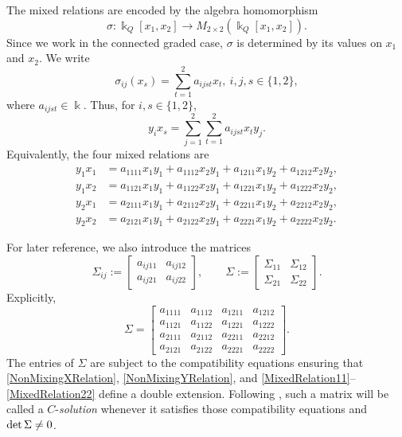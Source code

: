 \documentclass{amsart}
\theoremstyle{definition}
\theoremstyle{remark}
\numberwithin{equation}{section}
\begin{document}
The mixed relations are encoded by the algebra homomorphism
\[
\sigma:\Bbbk_Q[x_1,x_2]\to M_{2\times 2}(\Bbbk_Q[x_1,x_2]).
\]
Since we work in the connected graded case, $\sigma$ is determined by its values on $x_1$ and $x_2$. We write
\begin{equation}\label{SigmaCoordinates}
\sigma_{ij}(x_s)=\sum_{t=1}^2 a_{ijst}x_t,
\ i,j,s\in\{1,2\},
\end{equation}
where $a_{ijst}\in\Bbbk$. Thus, for $i,s\in\{1,2\}$,
\begin{equation}\label{GeneralMixedRelation}
y_ix_s
=
\sum_{j=1}^2\sum_{t=1}^2 a_{ijst}x_ty_j.
\end{equation}
Equivalently, the four mixed relations are
\begin{align}
y_1x_1
&=
a_{1111}x_1y_1+a_{1112}x_2y_1
+a_{1211}x_1y_2+a_{1212}x_2y_2, \label{MixedRelation11}\\
y_1x_2
&=
a_{1121}x_1y_1+a_{1122}x_2y_1
+a_{1221}x_1y_2+a_{1222}x_2y_2, \label{MixedRelation12}\\
y_2x_1
&=
a_{2111}x_1y_1+a_{2112}x_2y_1
+a_{2211}x_1y_2+a_{2212}x_2y_2, \label{MixedRelation21}\\
y_2x_2
&=
a_{2121}x_1y_1+a_{2122}x_2y_1
+a_{2221}x_1y_2+a_{2222}x_2y_2. \label{MixedRelation22}
\end{align}

For later reference, we also introduce the matrices
\begin{equation}\label{SigmaMatrices}
\Sigma_{ij}:=
\begin{bmatrix}
a_{ij11} & a_{ij12}\\
a_{ij21} & a_{ij22}
\end{bmatrix},
\qquad
\Sigma:=
\begin{bmatrix}
\Sigma_{11} & \Sigma_{12}\\
\Sigma_{21} & \Sigma_{22}
\end{bmatrix}.
\end{equation}
Explicitly,
\[
\Sigma=
\begin{bmatrix}
a_{1111} & a_{1112} & a_{1211} & a_{1212}\\
a_{1121} & a_{1122} & a_{1221} & a_{1222}\\
a_{2111} & a_{2112} & a_{2211} & a_{2212}\\
a_{2121} & a_{2122} & a_{2221} & a_{2222}
\end{bmatrix}.
\]
The entries of $\Sigma$ are subject to the compatibility equations ensuring that \eqref{NonMixingXRelation}, \eqref{NonMixingYRelation}, and \eqref{MixedRelation11}--\eqref{MixedRelation22} define a double extension. Following \cite{ZhangZhang2009}, such a matrix will be called a $C$-\emph{solution} whenever it satisfies those compatibility equations and ${\rm det}\,\Sigma\neq 0$.
\end{document}
